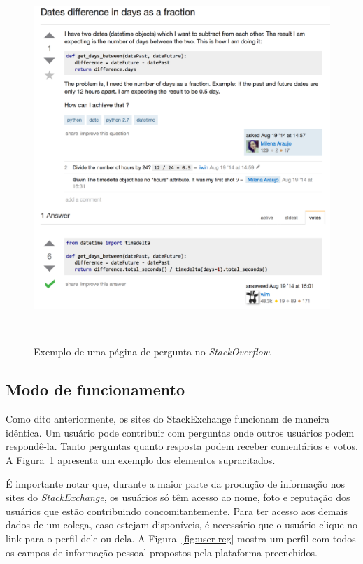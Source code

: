 \begin{figure}[!b]
  \includegraphics[width=1\columnwidth]{figures/post.png}
  \caption[Exemplo de uma página de pergunta no \emph{StackOverflow}]{Exemplo de uma página de pergunta no \emph{StackOverflow}.}~\label{fig:SOexemplo}
\end{figure}

\subsection{Modo de funcionamento} %
\label{sub:modo_de_funcionamento}

Como dito anteriormente, os sites do StackExchange funcionam de maneira idêntica. Um usuário pode contribuir com perguntas onde outros usuários podem respondê-la. Tanto perguntas quanto resposta podem receber comentários e votos. A Figura~\ref{fig:SOexemplo} apresenta um exemplo dos elementos supracitados.



É importante notar que, durante a maior parte da produção de informação nos sites do \emph{StackExchange}, os usuários só têm acesso ao nome, foto e reputação dos usuários que estão contribuindo concomitantemente. Para ter acesso aos demais dados de um colega, caso estejam disponíveis, é necessário que o usuário clique no link para o perfil dele ou dela. A Figura~\ref{fig:user-reg} mostra um perfil com todos os campos de informação pessoal propostos pela plataforma preenchidos.

